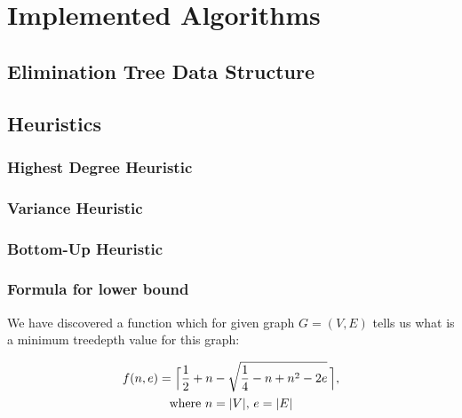 \section{Implemented Algorithms}
\subsection{Elimination Tree Data Structure}
\subsection{Heuristics}
\subsubsection{Highest Degree Heuristic}
\subsubsection{Variance Heuristic}
\subsubsection{Bottom-Up Heuristic}
\subsubsection{Formula for lower bound}
We have discovered a function which for given graph $G=(V,E)$ tells us what is a minimum treedepth value for this graph:

\begin{gather*}
f(n,e)=\Bigl\lceil\frac{1}{2}+n-\sqrt{\frac{1}{4}-n+n^2-2e}   \,\Bigr\rceil, \\
\text{where $n = |V|$, $e = |E|$}
\end{gather*}


